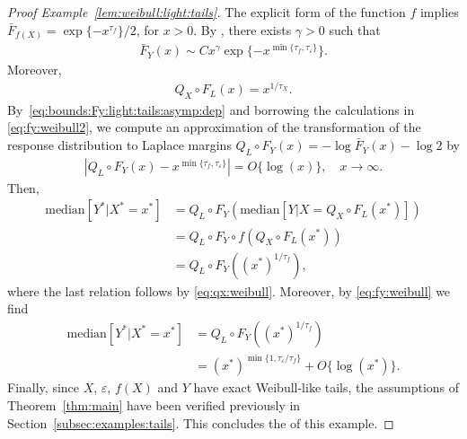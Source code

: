 \documentclass{statsoc}
\theoremstyle{break}
\newcommand{\eps}{\varepsilon}
\def\M{\text{median}}
\newcommand{\beam}{\begin{eqnarray}}
\newcommand{\eeam}{\end{eqnarray}\noindent}
\begin{document}
\begin{proof}[Proof Example~\ref{lem:weibull:light:tails}]
The explicit form of the function $f$ implies $\bar F_{f(X)} =  \exp\{-x^{\tau_f}\}/2$, for $x > 0$.
By \citet[][Remarks 2.2 and 3.1]{asmussen:hashorva:laub:taimre:2017}, there exists  $\gamma >0$ such that
\beam \label{eq:bounds:Fy:light:tails:asymp:dep}
	\bar F_Y(x) \sim Cx^{\gamma} \exp\{-x^{\min\{\tau_f,\tau_\eps\} }\}.
\eeam 
Moreover,
\beam \label{eq:qx:weibull}
Q_X \circ F_L(x)  = x^{1/\tau_X}.
\eeam 
By~\eqref{eq:bounds:Fy:light:tails:asymp:dep} and borrowing the calculations in \eqref{eq:fy:weibull2}, we compute an approximation of the transformation of the response distribution to Laplace margins $ Q_L \circ F_Y(x) =  -\log \bar F_Y(x) - \log 2$ by
\beam \label{eq:fy:weibull} 
|Q_L \circ F_Y(x) - x^{\min\{\tau_f,\tau_\eps\} } | = O\{\log(x)\}, \quad x \to \infty.  
\eeam 
Then, 
\begin{align*}
	\M[Y^* | X^* = x^*]  &= Q_L \circ F_Y( \M[Y | X = Q_X\circ F_L(x^*)] ) \\
		&= Q_L \circ F_Y \circ f(Q_X\circ F_L(x^*)) \\
		&= Q_L \circ F_Y ( (x^*)^{1/\tau_f}),
\end{align*}
where the last relation follows by \eqref{eq:qx:weibull}. Moreover, by \eqref{eq:fy:weibull} we find
\begin{align*} 		
		\M[Y^* | X^* = x^*]  & =  Q_L \circ F_Y ( (x^*)^{1/\tau_f} ) \\
		&= (x^*)^{\min\{1,\tau_\eps/\tau_f\} }  + O\{\log(x^*)\}.
\end{align*} 
Finally, 
since $X$, $\varepsilon$, $f(X)$ and $Y$ have exact Weibull-like tails, the assumptions of Theorem~\ref{thm:main} have been verified previously in Section~\ref{subsec:examples:tails}. This concludes the of this example. 
 \end{proof}







 
\end{document}
